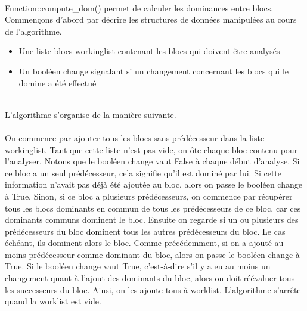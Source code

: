 \documentclass[a4paper,12pt]{report}
\begin{document}
\paragraph*{}
Function::compute\_dom() permet de calculer les dominances entre blocs. Commençons d'abord par décrire les structures de données manipulées au cours de l'algorithme. 
\newline
\begin{itemize}
    \item Une liste blocs workinglist contenant les blocs qui doivent être analysés
    \item Un booléen change signalant si un changement concernant les blocs qui le domine a été effectué
\end{itemize}
~\\
L'algorithme s'organise de la manière suivante. 
\\ \\
On commence par ajouter tous les blocs sans prédécesseur dans la liste workinglist. 
\newline
\newline
Tant que cette liste n'est pas vide, on ôte chaque bloc contenu pour l'analyser. Notons que le booléen change vaut False à chaque début d'analyse.
\newline
\newline
Si ce bloc a un seul prédécesseur, cela signifie qu'il est dominé par lui. Si cette information n'avait pas déjà été ajoutée au bloc, alors on passe le booléen change à True. 
\newline
\newline
Sinon, si ce bloc a plusieurs prédécesseurs, on commence par récupérer tous les blocs dominants en commun de tous les prédécesseurs de ce bloc, car ces dominants communs dominent le bloc. Ensuite on regarde si un ou plusieurs des prédécesseurs du bloc dominent tous les autres prédécesseurs du bloc. Le cas échéant, ils dominent alors le bloc. Comme précédemment, si on a ajouté au moins prédécesseur comme dominant du bloc, alors on passe le booléen change à True.
\newline
\newline
Si le booléen change vaut True, c'est-à-dire s'il y a eu au moins un changement quant à l'ajout des dominants du bloc, alors on doit réévaluer tous les successeurs du bloc. Ainsi, on les ajoute tous à worklist.
\newline\newline
L'algorithme s'arrête quand la worklist est vide.
\end{document}
